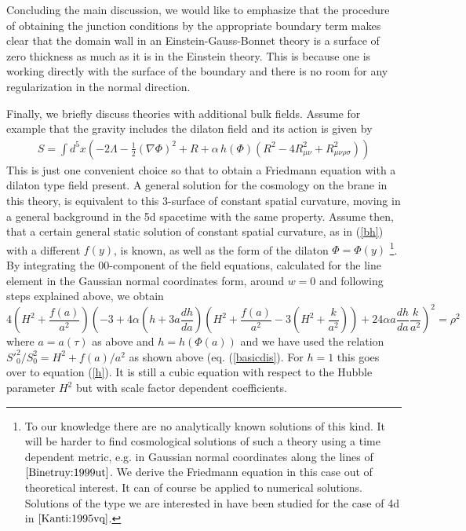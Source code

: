 \documentclass[a4paper,a4paper]{article}
\begin{document}
Concluding the main discussion, we would like to emphasize that the procedure of obtaining the junction conditions
by the appropriate boundary term makes clear that the domain wall in an Einstein-Gauss-Bonnet theory
is a surface of zero thickness as much as it is in the Einstein theory. This is because 
one is working directly with the surface of the boundary and there is no room
for any regularization in the normal direction.

Finally, we briefly discuss theories with additional bulk fields.
 Assume for example that the gravity
includes the dilaton field and its action is given by 
\begin{eqnarray}
S=\int d^5x \left( -2\Lambda-\frac{1}{2} (\nabla \Phi)^2
+R+ \alpha\, h(\Phi) (R^2-4 R^2_{\mu\nu}+R^2_{\mu\nu\rho\sigma})
 \right)
\end{eqnarray}
This is just one convenient choice so that to obtain a Friedmann equation with a dilaton type
field present. A general solution for the cosmology on the brane in this theory, is
equivalent to this 3-surface of constant spatial curvature, moving
in a general background in the 5d spacetime with the same property.
Assume then, that a certain general static solution of constant spatial
curvature, as in (\ref{bh}) with a different $f(y)$, is known, as well as the form 
of the dilaton $\Phi=\Phi(y)$
\footnote{To our knowledge there are no analytically  known solutions of this kind. 
It will be harder to find cosmological solutions of such a theory 
using a time dependent metric, e.g. in Gaussian normal coordinates
along the lines of $\cite{Binetruy:1999ut}$.
We derive the Friedmann equation in this case out of theoretical interest. It
can of course be applied to numerical solutions. Solutions of the
type we are interested in have been studied for the case of 4d in $\cite{Kanti:1995vq}$.}.
 By integrating the 00-component of the field equations,
calculated
for the line element in the Gaussian normal coordinates form, 
around $w=0$ and following steps explained above, we obtain
\begin{equation}
4 \left( H^2+\frac{f(a)}{a^2} \right)
  \left( -3+ 4 \alpha \left(h+ 3 a \frac{dh}{da} \right)
  \left( 
 H^2+\frac{f(a)}{a^2} -3 \left(  H^2+\frac{k}{a^2} \right)  \right) 
+ 24 \alpha a \frac{dh}{da} \frac{k}{a^2} \right)^2=\rho^2
\end{equation}
where $a=a(\tau)$ as above and $h=h(\Phi(a))$ and we have used the relation
${S'}_0^2/S_0^2=H^2+f(a)/a^2$ as
shown above (eq. (\ref{basicdis}). For $h=1$ this goes over to equation (\ref{h}).
It is still a cubic equation with respect to the Hubble parameter $H^2$ but with 
scale factor dependent coefficients. 
\end{document}
